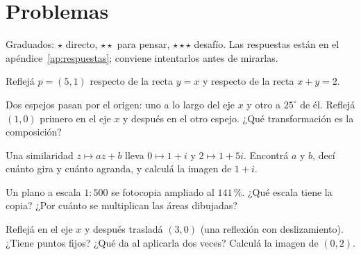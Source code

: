 \section{Problemas}\label{sec:problemas-03}

Graduados: \({\star}\) directo, \({\star}{\star}\) para pensar, \({\star}{\star}{\star}\) desafío. Las respuestas están en el apéndice~\ref{ap:respuestas}; conviene intentarlos antes de mirarlas.

\begin{problema}[\({\star}\)]\label{pb:03-1}
Reflejá \(p=(5,1)\) respecto de la recta \(y=x\) y respecto de la recta \(x+y=2\).
\end{problema}

\begin{problema}[\({\star}{\star}\)]\label{pb:03-2}
Dos espejos pasan por el origen: uno a lo largo del eje \(x\) y otro a \(25^\circ\) de él. Reflejá \((1,0)\) primero en el eje \(x\) y después en el otro espejo. ¿Qué transformación es la composición?
\end{problema}

\begin{problema}[\({\star}{\star}\)]\label{pb:03-3}
Una similaridad \(z\mapsto az+b\) lleva \(0\mapsto 1+i\) y \(2\mapsto 1+5i\). Encontrá \(a\) y \(b\), decí cuánto gira y cuánto agranda, y calculá la imagen de \(1+i\).
\end{problema}

\begin{problema}[\({\star}\)]\label{pb:03-4}
Un plano a escala \(1:500\) se fotocopia ampliado al \(141\)\,\%. ¿Qué escala tiene la copia? ¿Por cuánto se multiplican las áreas dibujadas?
\end{problema}

\begin{problema}[\({\star}{\star}{\star}\)]\label{pb:03-5}
Reflejá en el eje \(x\) y después trasladá \((3,0)\) (una reflexión con deslizamiento). ¿Tiene puntos fijos? ¿Qué da al aplicarla dos veces? Calculá la imagen de \((0,2)\).
\end{problema}
